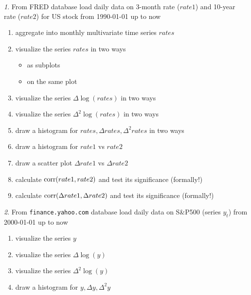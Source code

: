 \documentclass[12pt]{article}
\theoremstyle{remark}
\newtheorem{exercise}{}[section]
\begin{document}
\begin{exercise}
From FRED database load daily data on 3-month rate (\(rate1\)) and 10-year rate (\(rate2\))
for US stock from 1990-01-01 up to now
\begin{enumerate}
	\item aggregate into monthly multivariate time series \(rates\)
	\item visualize the series \(rates\) in two ways
	\begin{itemize}
		\item as subplots
		\item on the same plot
	\end{itemize}
	\item visualize the series \(\Delta\log(rates)\) in two ways
	\item visualize the series \(\Delta^2\log(rates)\) in two ways
	\item draw a histogram for \(rates,\Delta rates,\Delta^2 rates\) in two ways
	\item draw a histogram for \(rate1\) vs \(rate2\)
	\item draw a scatter plot \(\Delta rate1 \) vs \(\Delta rate2\)
	\item calculate \(\operatorname{corr}(rate1, rate2)\) and test its significance (formally!)
	\item calculate \(\operatorname{corr}(\Delta rate1, \Delta rate2)\) and test its significance (formally!)
\end{enumerate}
\end{exercise}

\begin{exercise}
From \texttt{finance.yahoo.com} database load daily data on S\&P500 (series \(y_t\))
from 2000-01-01 up to now
\begin{enumerate}
	\item visualize the series \(y\) 
	\item visualize the series \(\Delta\log(y)\)
	\item visualize the series \(\Delta^2\log(y)\)
	\item draw a histogram for \(y,\Delta y,\Delta^2 y\)
\end{enumerate}
\end{exercise}
\end{document}
